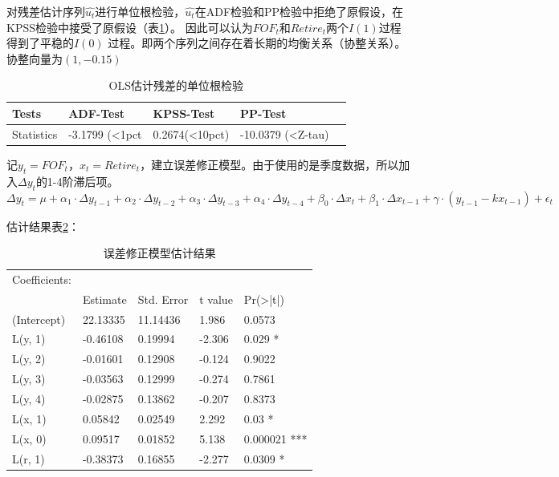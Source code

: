 \documentclass[10.5pt,onecolumn,a4paper]{article}%
\begin{document}
对残差估计序列${\hat{u_t}}$进行单位根检验，${\hat{u_t}}$在ADF检验和PP检验中拒绝了原假设，在KPSS检验中接受了原假设（表\ref{tb:adf}）。
因此可以认为${FOF_t}$和${Retire_t}$两个$I(1)$过程得到了平稳的$I(0)$
过程。即两个序列之间存在着长期的均衡关系（协整关系）。协整向量为$(1, -0.15)$

\begin{table}[]
    \centering
    \caption{OLS估计残差的单位根检验}
    \label{tb:adf}
    \begin{tabular}{l | llll}
        Tests        & ADF-Test       & KPSS-Test      & PP-Test               \\  \hline
        Statistics   & -3.1799 (<1pct & 0.2674(<10pct) & -10.0379 (<Z-tau)  
    \end{tabular}
\end{table}

记$y_t = FOF_t$，$x_t = Retire_t$，建立误差修正模型。由于使用的是季度数据，所以加入$\Delta y_t$的1-4阶滞后项。
$$\Delta y_t = \mu+ \alpha_1 \cdot \Delta y_{t-1} + \alpha_2  \cdot \Delta  y_{t-2} + \alpha_3 \cdot \Delta  y_{t-3} + \alpha_4 \cdot \Delta  y_{t-4} + \beta_0 \cdot \Delta  x_t+\beta_1 \cdot \Delta  x_{t-1} +\gamma \cdot ( y_{t-1}-kx_{t-1}) + \epsilon_t$$


估计结果表\ref{tb:ecm}：
\begin{table}[]
    \centering
    \caption{误差修正模型估计结果}
    \label{tb:ecm}
    \begin{tabular}{l | llll}
        Coefficients: &          &            &         &                     \\
                      & Estimate & Std. Error & t value & Pr(\textgreater|t|) \\  \hline
        (Intercept)   & 22.13335 & 11.14436   & 1.986   & 0.0573              \\
        L(y, 1)       & -0.46108 & 0.19994    & -2.306  & 0.029 *             \\
        L(y, 2)       & -0.01601 & 0.12908    & -0.124  & 0.9022              \\
        L(y, 3)       & -0.03563 & 0.12999    & -0.274  & 0.7861              \\
        L(y, 4)       & -0.02875 & 0.13862    & -0.207  & 0.8373              \\
        L(x, 1)       & 0.05842  & 0.02549    & 2.292   & 0.03 *              \\
        L(x, 0)       & 0.09517  & 0.01852    & 5.138   & 0.000021 ***        \\
        L(r, 1)       & -0.38373 & 0.16855    & -2.277  & 0.0309 *           
    \end{tabular}
\end{table}
\end{document}
